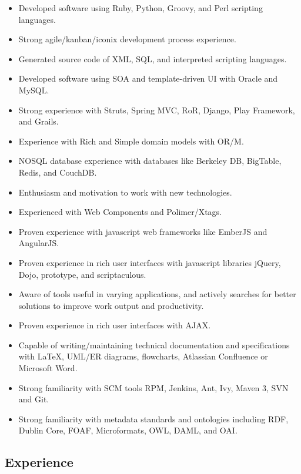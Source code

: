 \documentclass[10pt,letterpaper]{article}
\begin{document}
\begin{itemize}
\item Developed software using Ruby, Python, Groovy, and Perl scripting languages.
\item Strong agile/kanban/iconix development process experience.
\item Generated source code of XML, SQL, and interpreted scripting languages.
\item Developed software using SOA and template-driven UI with Oracle and MySQL.
\item Strong experience with Struts, Spring MVC, RoR, Django, Play Framework, and Grails.
\item Experience with Rich and Simple domain models with OR/M.
\item NOSQL database experience with databases like Berkeley DB, BigTable, Redis, and CouchDB.
\item Enthusiasm and motivation to work with new technologies.
\item Experienced with Web Components and Polimer/Xtags.
\item Proven experience with javascript web frameworks like EmberJS and AngularJS.
\item Proven experience in rich user interfaces with javascript libraries jQuery, Dojo, 
  prototype, and scriptaculous.
\item Aware of tools useful in varying applications, and actively
  searches for better solutions to improve work output and productivity.
\item Proven experience in rich user interfaces with AJAX.
\item Capable of writing/maintaining technical documentation and
  specifications with LaTeX, UML/ER diagrams, flowcharts, Atlassian Confluence or Microsoft Word.
\item Strong familiarity with SCM tools RPM, Jenkins, Ant, Ivy, Maven 3, SVN and Git.
\item Strong familiarity with metadata standards and ontologies
  including RDF, Dublin Core, FOAF, Microformats, OWL, DAML, and OAI.
\end{itemize}

\subsection*{Experience}
\end{document}
